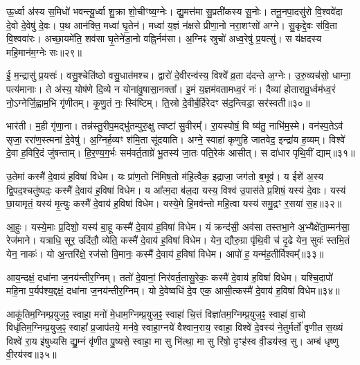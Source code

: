 {\anuvakamend[{इ॒मे शि॒वो अ॒ग्ने\-ऽति॒ सौभ॑गाय॒ चतु॑स्त्रिꣳशच्च॥७॥}]}

ऊ॒र्ध्वा अ॑स्य स॒मिधो॑ भवन्त्यू॒र्ध्वा शु॒क्रा शो॒चीꣳष्य॒ग्नेः। द्यु॒मत्त॑मा सु॒प्रती॑कस्य सू॒नोः। तनू॒नपा॒दसु॑रो वि॒श्ववे॑दा दे॒वो दे॒वेषु॑ दे॒वः। प॒थ आन॑क्ति॒ मध्वा॑ घृ॒तेन॑। मध्वा॑ य॒ज्ञं न॑क्षसे प्रीणा॒नो नरा॒शꣳसो॑ अग्ने। सु॒कृद्दे॒वः स॑वि॒ता वि॒श्ववा॑रः। अच्छा॒यमे॑ति॒ शव॑सा घृ॒तेने॑डा॒नो वह्नि॒र्नम॑सा। अ॒ग्निꣴ स्रुचो॑ अध्व॒रेषु॑ प्र॒यत्सु॑। स य॑क्षदस्य महि॒मान॑म॒ग्नेः सः॥२९॥

ई॒ म॒न्द्रासु॑ प्र॒यसः॑। वसु॒श्चेति॑ष्ठो वसु॒धात॑मश्च। द्वारो॑ दे॒वीरन्व॑स्य॒ विश्वे᳚ व्र॒ता द॑दन्ते अ॒ग्नेः। उ॒रु॒व्यच॑सो॒ धाम्ना॒ पत्य॑मानाः। ते अ॑स्य॒ योष॑णे दि॒व्ये न योना॑वु॒षासा॒नक्ता᳚। इ॒मं य॒ज्ञम॑वतामध्व॒रं नः॑। दैव्या॑ होतारावू॒र्ध्वम॑ध्व॒रं नो॒\-ऽग्नेर्जि॒ह्वाम॒भि गृ॑णीतम्। कृ॒णु॒तं नः॒ स्वि॑ष्टिम्। ति॒स्रो दे॒वीर्ब॒र्हिरेदꣳ स॑द॒न्त्विडा॒ सर॑स्वती॥३०॥

भार॑ती। म॒ही गृ॑णा॒ना। तन्न॑स्तु॒रीप॒मद्भु॑तम्पुरु॒क्षु त्वष्टा॑ सु॒वीरम्᳚। रा॒यस्पोषं॒ वि ष्य॑तु॒ नाभि॑म॒स्मे। वन॑स्प॒ते\-ऽव॑ सृजा॒ ररा॑ण॒स्त्मना॑ दे॒वेषु॑। अ॒ग्निर्\mbox{}ह॒व्यꣳ श॑मि॒ता सू॑दयाति। अग्ने॒ स्वाहा॑ कृणुहि जातवेद॒ इन्द्रा॑य ह॒व्यम्। विश्वे॑ दे॒वा ह॒विरि॒दं जु॑षन्ताम्। हि॒र॒ण्य॒ग॒र्भः सम॑वर्त॒ताग्रे॑ भू॒तस्य॑ जा॒तः पति॒रेक॑ आसीत्। स दा॑धार पृथि॒वीं द्याम्॥३१॥

उ॒तेमां कस्मै॑ दे॒वाय॑ ह॒विषा॑ विधेम। यः प्रा॑ण॒तो नि॑मिष॒तो म॑हि॒त्वैक॒ इद्राजा॒ जग॑तो ब॒भूव॑। य ईशे॑ अ॒स्य द्वि॒पद॒श्चतु॑ष्पदः॒ कस्मै॑ दे॒वाय॑ ह॒विषा॑ विधेम। य आ᳚त्म॒दा ब॑ल॒दा यस्य॒ विश्व॑ उ॒पास॑ते प्र॒शिषं॒ यस्य॑ दे॒वाः। यस्य॑ छा॒यामृतं॒ यस्य॑ मृ॒त्युः कस्मै॑ दे॒वाय॑ ह॒विषा॑ विधेम। यस्ये॒मे हि॒मव॑न्तो महि॒त्वा यस्य॑ समु॒द्रꣳ र॒सया॑ स॒ह॥३२॥

आ॒हुः। यस्ये॒माः प्र॒दिशो॒ यस्य॑ बा॒हू कस्मै॑ दे॒वाय॑ ह॒विषा॑ विधेम। यं क्रन्द॑सी॒ अव॑सा तस्तभा॒ने अ॒भ्यैक्षे॑ता॒म्मन॑सा॒ रेज॑माने। यत्राधि॒ सूर॒ उदि॑तौ॒ व्येति॒ कस्मै॑ दे॒वाय॑ ह॒विषा॑ विधेम। येन॒ द्यौरु॒ग्रा पृ॑थि॒वी च॑ दृ॒ढे येन॒ सुवः॑ स्तभि॒तं येन॒ नाकः॑। यो अ॒न्तरि॑क्षे॒ रज॑सो वि॒मानः॒ कस्मै॑ दे॒वाय॑ ह॒विषा॑ विधेम। आपो॑ ह॒ यन्म॑ह॒तीर्विश्वम्᳚॥३३॥

आय॒न्दक्षं॒ दधा॑ना ज॒नय॑न्तीर॒ग्निम्। ततो॑ दे॒वानां॒ निर॑वर्त॒तासु॒रेकः॒ कस्मै॑ दे॒वाय॑ ह॒विषा॑ विधेम। यश्चि॒दापो॑ महि॒ना प॒र्यप॑श्य॒द्दक्षं॒ दधा॑ना ज॒नय॑न्तीर॒ग्निम्। यो दे॒वेष्वधि॑ दे॒व एक॒ आसी॒त्कस्मै॑ दे॒वाय॑ ह॒विषा॑ विधेम॥३४॥

{\anuvakamend[{अ॒ग्नेः स सर॑स्वती॒ द्याꣳ स॒ह विश्व॒ञ्चतु॑स्त्रिHꣳशश्च॥८॥}]}

आकू॑तिम॒ग्निम्प्र॒युज॒ꣴ॒ स्वाहा॒ मनो॑ मे॒धाम॒ग्निम्प्र॒युज॒ꣴ॒ स्वाहा॑ चि॒त्तं विज्ञा॑तम॒ग्निम्प्र॒युज॒ꣴ॒ स्वाहा॑ वा॒चो विधृ॑तिम॒ग्निम्प्र॒युज॒ꣴ॒ स्वाहा᳚ प्र॒जाप॑तये॒ मन॑वे॒ स्वाहा॒ग्नये॑ वैश्वान॒राय॒ स्वाहा॒ विश्वे॑ दे॒वस्य॑ ने॒तुर्मर्तो॑ वृणीत स॒ख्यं विश्वे॑ रा॒य इ॑षुध्यसि द्यु॒म्नं वृ॑णीत पु॒ष्यसे॒ स्वाहा॒ मा सु भि॑त्था॒ मा सु रि॑षो॒ दृꣳह॑स्व वी॒डय॑स्व॒ सु। अम्ब॑ धृष्णु वी॒रय॑स्व॥३५॥

